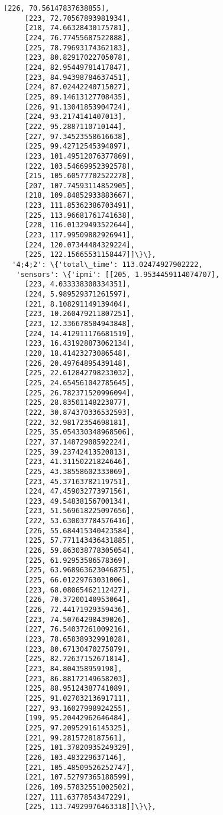 \documentclass[11pt]{article}
\begin{document}
\begin{tcolorbox}[breakable, size=fbox, boxrule=.5pt, pad at break*=1mm, opacityfill=0]
\begin{Verbatim}[commandchars=\\\{\}]
     [226, 70.56147837638855],
     [223, 72.70567893981934],
     [218, 74.66328430175781],
     [224, 76.77455687522888],
     [225, 78.79693174362183],
     [223, 80.82917022705078],
     [224, 82.95449781417847],
     [223, 84.94398784637451],
     [224, 87.02442240715027],
     [225, 89.14613127708435],
     [226, 91.13041853904724],
     [224, 93.2174141407013],
     [222, 95.2887110710144],
     [227, 97.34523558616638],
     [225, 99.42712545394897],
     [223, 101.49512076377869],
     [222, 103.54669952392578],
     [215, 105.60577702522278],
     [207, 107.74593114852905],
     [218, 109.84852933883667],
     [223, 111.85362386703491],
     [225, 113.96681761741638],
     [228, 116.01329493522644],
     [223, 117.99509882926941],
     [224, 120.07344484329224],
     [225, 122.15665531158447]]\}\},
  '4;4;2': \{'total\_time': 113.02474927902222,
   'sensors': \{'ipmi': [[205, 1.9534459114074707],
     [223, 4.033338308334351],
     [224, 5.989529371261597],
     [221, 8.108291149139404],
     [223, 10.260479211807251],
     [223, 12.336678504943848],
     [224, 14.412911176681519],
     [223, 16.431928873062134],
     [220, 18.41423273086548],
     [226, 20.49764895439148],
     [225, 22.612842798233032],
     [225, 24.654561042785645],
     [225, 26.782371520996094],
     [225, 28.83501148223877],
     [222, 30.874370336532593],
     [222, 32.98172354698181],
     [225, 35.054330348968506],
     [227, 37.14872908592224],
     [225, 39.23742413520813],
     [223, 41.31150221824646],
     [225, 43.38558602333069],
     [223, 45.37163782119751],
     [224, 47.45903277397156],
     [223, 49.54838156700134],
     [223, 51.569618225097656],
     [222, 53.630037784576416],
     [226, 55.684415340423584],
     [225, 57.771143436431885],
     [226, 59.863038778305054],
     [225, 61.92953586578369],
     [225, 63.968963623046875],
     [225, 66.01229763031006],
     [223, 68.08065462112427],
     [226, 70.37200140953064],
     [226, 72.44171929359436],
     [223, 74.50764298439026],
     [227, 76.54037261009216],
     [223, 78.65838932991028],
     [223, 80.67130470275879],
     [225, 82.72637152671814],
     [223, 84.804358959198],
     [223, 86.88172149658203],
     [225, 88.95124387741089],
     [225, 91.02703213691711],
     [227, 93.16027998924255],
     [199, 95.20442962646484],
     [225, 97.20952916145325],
     [221, 99.2815728187561],
     [225, 101.37820935249329],
     [226, 103.483229637146],
     [221, 105.48509526252747],
     [221, 107.52797365188599],
     [226, 109.57832551002502],
     [227, 111.6377854347229],
     [225, 113.74929976463318]]\}\},

\end{Verbatim}
\end{tcolorbox}
\end{document}
